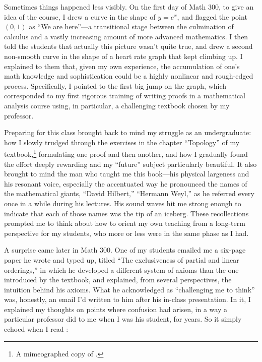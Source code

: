 \documentclass{rs}
\theoremstyle{definition}
\theoremstyle{remark}
\renewcommand{\=}{\approx}
\renewcommand{\-}{\sim}
\numberwithin{equation}{section}
\begin{document}
Sometimes things happened less visibly.  On the first day of Math 300, to give 
an idea of the course, I drew a curve in the shape of $y = e^x$, and flagged the 
point $(0,1)$ as ``We are here''---a transitional stage between the culmination 
of calculus and a vastly increasing amount of more advanced mathematics.  I then 
told the students that actually this picture wasn't quite true, and drew a 
second non-smooth curve in the shape of a heart rate graph that kept climbing 
up.  I explained to them that, given my own experience, the accumulation of 
one's math knowledge and sophistication could be a highly nonlinear and 
rough-edged process.  Specifically, I pointed to the first big jump on the 
graph, which corresponded to my first rigorous training of writing proofs in a 
mathematical analysis course using, in particular, a challenging textbook chosen 
by my professor.  

Preparing for this class brought back to mind my struggle as an undergraduate: 
how I slowly trudged through the exercises in the chapter ``Topology'' of my 
textbook,\footnote{A mimeographed copy of \cite{Browder}.} formulating one proof 
and then another, and how I gradually found the effort deeply rewarding and my 
``future'' subject particularly beautiful.  It also brought to mind the man who 
taught me this book---his physical largeness and his resonant voice, especially 
the accentuated way he pronounced the names of the mathematical giants, ``David 
Hilbert,'' ``Hermann Weyl,'' as he referred every once in a while during his 
lectures.  His sound waves hit me strong enough to indicate that each of those 
names was the tip of an iceberg.  These recollections prompted me to think about 
how to orient my own teaching from a long-term perspective for my students, who 
more or less were in the same phase as I had.  

A surprise came later in Math 300.  One of my students emailed me a six-page 
paper he wrote and typed up, titled ``The exclusiveness of partial and linear 
orderings,'' in which he developed a different system of axioms than the one 
introduced by the textbook, and explained, from several perspectives, the 
intuition behind his axioms.  What he acknowledged as ``challenging me to 
think'' was, honestly, an email I'd written to him after his in-class 
presentation.  In it, I explained my thoughts on points where confusion had 
arisen, in a way a particular professor did to me when I was his student, for 
years.  So it simply echoed when I read \cite[p.151]{Tomes}: 
\end{document}
